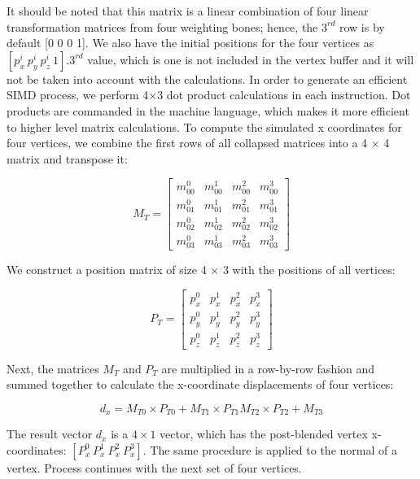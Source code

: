It should be noted that this matrix is a linear combination of four linear transformation matrices from four weighting bones; hence, the $3^{rd}$ row is by default [0 0 0 1]. We also have the initial positions for the four vertices as $[p^i_x \: p^i_y  \: p^i_z  \: 1]$.$3^{rd}$ value, which is one is not included in the vertex buffer and it will not be taken into account with the calculations. In order to generate an efficient SIMD process, we perform 4$\times$3 dot product calculations in each instruction. Dot products are commanded in the machine language, which makes it more efficient to higher level matrix calculations. To compute the simulated x coordinates for  four vertices, we combine the first rows of all collapsed matrices into a 4 $\times$ 4 matrix and transpose it:

\begin{equation}
M_T=
\begin{bmatrix}
m_{00}^0 & m_{00}^1 & m_{00}^2 & m_{00}^3 \\
m_{01}^0 & m_{01}^1 & m_{01}^2 & m_{01}^3 \\
m_{02}^0 & m_{02}^1 & m_{02}^2 & m_{02}^3 \\
m_{03}^0 & m_{03}^1 & m_{03}^2 & m_{03}^3 
\end{bmatrix}
\label{eqn:transposed_weight_matrix}
\end{equation}

We construct a position matrix of size 4 $\times$ 3 with the positions of all vertices:

\begin{equation}
P_T=
\begin{bmatrix}
p_{x}^0 & p_{x}^1 & p_{x}^2 & p_{x}^3 \\
p_{y}^0 & p_{y}^1 & p_{y}^2 & p_{y}^3 \\
p_{z}^0 & p_{z}^1 & p_{z}^2 & p_{z}^3  
\end{bmatrix}
\label{eqn:transposed_position_matrix}
\end{equation}

Next, the matrices $M_T$ and $P_T$ are multiplied in a row-by-row fashion and summed together to calculate the x-coordinate displacements
of four vertices:

\begin{equation}
d_x=M_{T0} \times P_{T0} + M_{T1} \times P_{T1} M_{T2} \times P_{T2} +M_{T3}
\label{eqn:collapsed_matrix}
\end{equation}

The result vector $d_x$ is a $4 \times 1$ vector, which has the post-blended vertex x-coordinates: $[P^0_x \: P^1_x  \: P^2_x  \: P^3_x]$. The same procedure is applied to the normal of a vertex. Process continues with the next set of four vertices. 

